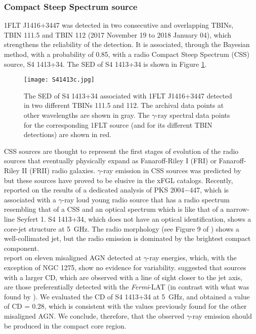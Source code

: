 \documentclass{aastex62}
\newcommand\fermilat{{\it Fermi}-LAT }
\begin{document}
\subsubsection{Compact Steep Spectrum source}
1FLT J1416$+$3447 was detected in two consecutive and overlapping TBINs, TBIN 111.5 and TBIN 112 (2017 November 19 to 2018 January 04), which strengthens the reliability of the detection. It is associated, through the Bayesian method, with a probability of 0.85, with a radio Compact Steep Spectrum (CSS) source, S4 1413+34. The SED of S4 1413+34 is shown in Figure \ref{figure:S41413}.\\
\begin{figure}[hbt!]
    \centering
    \texttt{[image: S41413c.jpg]}
    \caption{The SED of S4 1413+34 associated with 1FLT J1416+3447 detected in two different TBINs 111.5 and 112. The archival data points at other wavelengths are shown in gray. The $\gamma$-ray spectral data points for the corresponding 1FLT source (and for its different TBIN detections) are shown in red.}\label{figure:S41413}
\end{figure}
CSS sources are thought to represent the first stages of evolution of the radio sources that eventually physically expand as Fanaroff-Riley I (FRI) or Fanaroff-Riley II (FRII) radio galaxies. $\gamma$-ray emission in CSS sources was predicted by \citet{stawarz2008gamma} but these sources have proved to be elusive in the xFGL catalogs. 
Recently, \citet{shultz} reported on the results of a dedicated analysis of PKS 2004$-$447, which is associated with a $\gamma$-ray loud young radio source that has a radio spectrum resembling that of a CSS and an optical spectrum which is like that of a narrow-line Seyfert 1.
S4 1413+34, which does not have an optical identification,  shows a core-jet structure at 5~GHz. The  radio morphology (see Figure 9 of \citealt{Dallacasa2013}) shows a well-collimated jet, but the radio emission is dominated by the brightest compact component.\\
\citet{abdo2010magn} report on eleven misaligned AGN detected at $\gamma$-ray energies, which, with the exception of NGC 1275, show no evidence for variability. \citet{abdo2010magn} suggested that sources with a larger CD, which are observed with a line of sight closer to the jet  axis, are those preferentially  detected  with  the \fermilat (in contrast with what was found by \citealt{angioni}). We evaluated the CD of S4 1413+34 at 5~GHz, and obtained a value of CD = 0.28, which  is consistent with the values previously found for the other misaligned AGN. We conclude, therefore, that the observed $\gamma$-ray emission should be produced in the compact core region.
\end{document}
